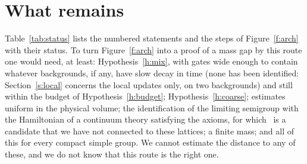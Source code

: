 \section{What remains}\label{s:rem}
Table~\ref{tab:status} lists the numbered statements and the steps of Figure~\ref{f:arch} with their status. To turn Figure~\ref{f:arch} into a proof of a
mass gap by this route one would need, at least: Hypothesis~\ref{h:mix}, with gates wide enough to contain
whatever backgrounds, if any, have slow decay in time (none has been identified: Section~\ref{s:local}
concerns the local updates only, on two backgrounds) and still within the budget of Hypothesis~\ref{h:budget};
Hypothesis~\ref{h:coarse}; estimates uniform in the physical volume; the identification of the limiting
semigroup with the Hamiltonian of a continuum theory satisfying the axioms, for which~\cite{OAI} is a
candidate that we have not connected to these lattices; a finite mass; and all of this for every compact
simple group. We cannot estimate the distance to any of these, and we do not know that this route is the
right one.

